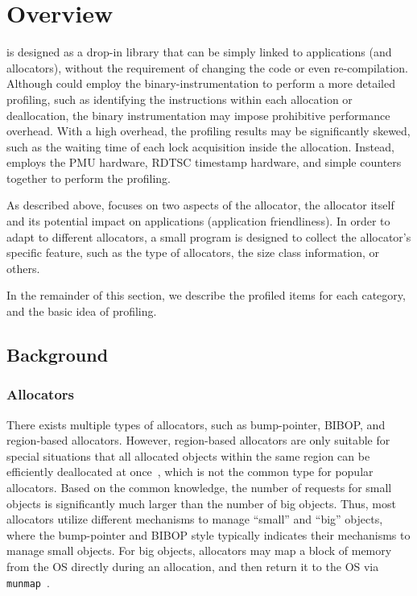 \section{Overview}

\MP{} is designed as a drop-in library that can be simply linked to applications (and allocators), without the requirement of changing the code or even re-compilation. Although \MP{} could employ the binary-instrumentation to perform a more detailed profiling, such as identifying the instructions within each allocation or deallocation, the binary instrumentation may impose prohibitive performance overhead. With a high overhead, the profiling results may be significantly skewed, such as the waiting time of each lock acquisition inside the allocation. Instead, \MP{} employs the PMU hardware, RDTSC timestamp hardware, and simple counters together to perform the profiling.  
 
As described above, \MP{} focuses on two aspects of the allocator, the allocator itself and its potential impact on applications (application friendliness). In order to adapt to different allocators, a small program is designed to collect the allocator's specific feature, such as the type of allocators, the size class information, or others. 

In the remainder of this section, we describe the profiled items for each category, and the basic idea of profiling. 

\subsection{Background}

\subsubsection{Allocators}

\label{sec:allocator}

There exists multiple types of allocators, such as bump-pointer, BIBOP, and region-based allocators. However, region-based allocators are only suitable for special situations that all allocated objects within the same region can be efficiently deallocated at once~\cite{Gay:1998:MME:277650.277748}, which is not the common type for popular allocators. Based on the common knowledge,  the number of requests for small objects is significantly much larger than the number of big objects. Thus, most allocators utilize different mechanisms to manage ``small'' and ``big'' objects, where the bump-pointer and BIBOP style typically indicates their mechanisms to manage small objects. For big objects, allocators may map a block of memory from the OS directly during an allocation, and then return it to the OS via \texttt{munmap}~\cite{Hoard}.   

